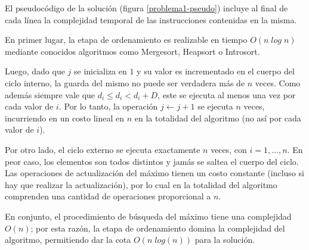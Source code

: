 El pseudocódigo de la solución (figura \ref{problema1-pseudo}) incluye al final de cada línea la complejidad temporal de las instrucciones contenidas en la misma.

En primer lugar, la etapa de ordenamiento es realizable en tiempo $O(n\;log\;n)$ mediante conocidos algoritmos como Mergesort, Heapsort o Introsort.

Luego, dado que $j$ se inicializa en $1$ y su valor es incrementado en el cuerpo del ciclo interno, la guarda del mismo no puede ser verdadera más de $n$ veces. Como además siempre vale que $d_i \leq d_i < d_i + D$, este se ejecuta al menos una vez por cada valor de $i$. Por lo tanto, la operación $j \leftarrow j + 1$ se ejecuta $n$ veces, incurriendo en un costo lineal en $n$ en la totalidad del algoritmo (no así por cada valor de $i$).

Por otro lado, el ciclo externo se ejecuta exactamente $n$ veces, con $i = 1, ..., n$. En peor caso, los elementos son todos distintos y jamás se saltea el cuerpo del ciclo. Las operaciones de actualización del máximo tienen un costo constante (incluso si hay que realizar la actualización), por lo cual en la totalidad del algoritmo comprenden una cantidad de operaciones proporcional a $n$.

En conjunto, el procedimiento de búsqueda del máximo tiene una complejidad $O(n)$; por esta razón, la etapa de ordenamiento domina la complejidad del algoritmo, permitiendo dar la cota $O(n\;log(n))$ para la solución.







